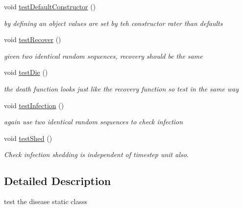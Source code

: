 \begin{DoxyCompactItemize}
\mbox{\label{classdiseaseTest_a1559f0bcf9c829f890b891ded00c746f}} 
void \mbox{\hyperlink{classdiseaseTest_a1559f0bcf9c829f890b891ded00c746f}{test\+Default\+Constructor}} ()
\begin{DoxyCompactList}\small\item\em by defining an object values are set by teh constructor rater than defaults \end{DoxyCompactList}\item 
void \mbox{\hyperlink{classdiseaseTest_af072ce110dc0cb4e4dfd7938e03e01f4}{test\+Recover}} ()
\begin{DoxyCompactList}\small\item\em given two identical random sequences, recovery should be the same \end{DoxyCompactList}\item 
\mbox{\label{classdiseaseTest_a703842c90288f26dbe79fec811b7e214}} 
void \mbox{\hyperlink{classdiseaseTest_a703842c90288f26dbe79fec811b7e214}{test\+Die}} ()
\begin{DoxyCompactList}\small\item\em the death function looks just like the recovery function so test in the same way \end{DoxyCompactList}\item 
void \mbox{\hyperlink{classdiseaseTest_ac6ddc9154b76e19798cd72c144d67c53}{test\+Infection}} ()
\begin{DoxyCompactList}\small\item\em again use two identical random sequences to check infection \end{DoxyCompactList}\item 
\mbox{\label{classdiseaseTest_aec9719173d92e888f32ada40f567467a}} 
void \mbox{\hyperlink{classdiseaseTest_aec9719173d92e888f32ada40f567467a}{test\+Shed}} ()
\begin{DoxyCompactList}\small\item\em Check infection shedding is independent of timestep unit also. \end{DoxyCompactList}\end{DoxyCompactItemize}


\subsection{Detailed Description}
test the disease static classs 

